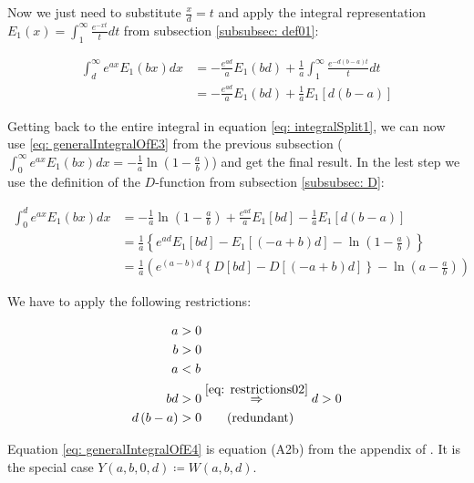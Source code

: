\documentclass[bibliography=totocnumbered]{scrartcl}
\begin{document}
	Now we just need to substitute $\frac{x}{d}=t$ and apply the integral representation $E_1\left(x\right)=\int_{1}^{\infty}\frac{e^{-xt}}{t}dt$ from subsection \ref{subsubsec: def01}:
	
	\begin{align}
		\int_{d}^{\infty}e^{ax}E_1\left(bx\right)dx&=-\frac{e^{ad}}{a}E_1\left(bd\right)+\frac{1}{a}\int_{1}^{\infty}\frac{e^{-d\left(b-a\right)t}}{t}dt\\
		&=-\frac{e^{ad}}{a}E_1\left(bd\right)+\frac{1}{a}E_1\left[d\left(b-a\right)\right]
	\end{align}
	
	Getting back to the entire integral in equation \eqref{eq: integralSplit1}, we can now use \eqref{eq: generalIntegralOfE3} from the previous subsection ($\int_{0}^{\infty}e^{ax}E_1\left(bx\right)dx=-\frac{1}{a}\ln\left(1-\frac{a}{b}\right)$) and get the final result. In the lest step we use the definition of the $D$-function from subsection \ref{subsubsec: D}:
	
	\begin{align}
		\int_{0}^{d}e^{ax}E_1\left(bx\right)dx&=-\frac{1}{a}\ln\left(1-\frac{a}{b}\right)+\frac{e^{ad}}{a}E_1\left[bd\right]-\frac{1}{a}E_1\left[d\left(b-a\right)\right]\\
		&=\frac{1}{a}\left\{e^{ad}E_1\left[bd\right]-E_1\left[\left(-a+b\right)d\right]-\ln{\left(1-\frac{a}{b}\right)}\right\}\\
		&=\frac{1}{a}\left(e^{\left(a-b\right)d}\left\{D\left[bd\right]-D\left[\left(-a+b\right)d\right]\right\}-\ln{\left(a-\frac{a}{b}\right)}\right)\label{eq: generalIntegralOfE4}
	\end{align}
	
	We have to apply the following restrictions:
	
	\begin{subequations}
		\begin{align}
			a&>0\label{eq: restrictions01}\\
			b&>0\label{eq: restrictions02}\\
			a&<b\label{eq: restrictions03}\\
			bd&>0\overset{\eqref{eq: restrictions02}}{\Rightarrow}d>0\\
			d\left(b-a\right)&>0\qquad\text{(redundant)}
		\end{align}
	\end{subequations}
	
	Equation \eqref{eq: generalIntegralOfE4} is equation (A2b) from the appendix of \cite{boer1990calc}. It is the special case $Y\left(a,b,0,d\right)\coloneqq{}W\left(a,b,d\right)$.
	
\end{document}
